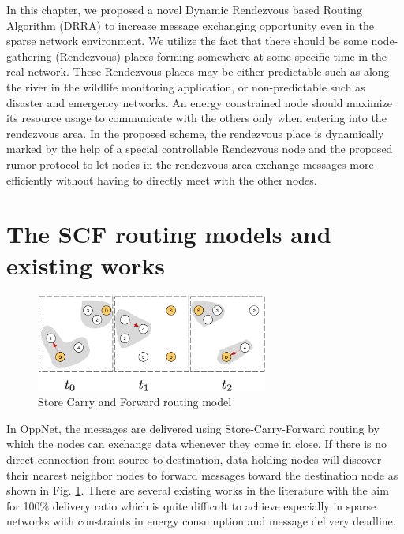 In this chapter, we proposed a novel Dynamic Rendezvous based Routing Algorithm (DRRA) to increase message exchanging opportunity even in the sparse network environment.
We utilize the fact that there should be some node-gathering (Rendezvous) places forming somewhere at some specific time in the real network.
These Rendezvous places may be either predictable such as along the river in the wildlife monitoring application, or non-predictable such as disaster and emergency networks.
An energy constrained node should maximize its resource usage to communicate with the others only when entering into the rendezvous area.
In the proposed scheme, the rendezvous place is dynamically marked by the help of a special controllable Rendezvous node and the proposed rumor protocol to let nodes in the rendezvous area exchange messages more efficiently without having to directly meet with the other nodes.

\section{The SCF routing models and existing works}
\label{DRRA:The SCF routing models and existing works}

\begin{figure}[!t]
	\centering
	\includegraphics[width=3in]{Figures/SFC.pdf}
	\caption{Store Carry and Forward routing model}
	\label{SFC}
\end{figure}

In OppNet, the messages are delivered using Store-Carry-Forward routing by which  the nodes can exchange data whenever they come in close.
If there is no direct connection from source to destination, data holding nodes will discover their nearest neighbor nodes to forward messages toward the destination node as shown in Fig. \ref{SFC}.
There are several existing works in the literature \cite{Vahdat2000, Harras2005, Neena2013, Lindgren2003,Brendan2005,Boldrini2007,Kerdsri2013} with the aim for 100\% delivery ratio which is quite difficult to achieve especially in sparse networks with constraints in energy consumption and message delivery deadline.

